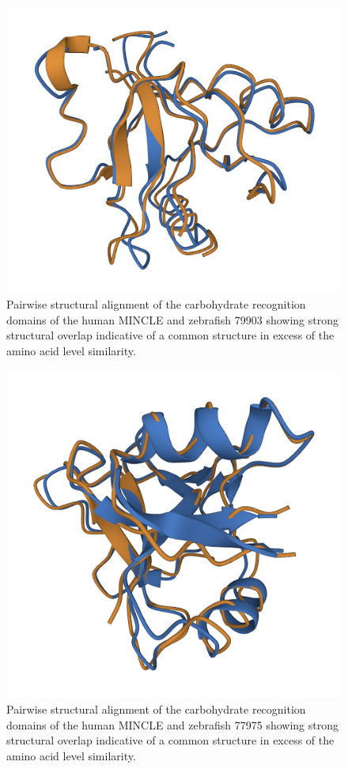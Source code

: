 \begin{figure}
\centering
\includegraphics[width=\textwidth]{images/79903_align.png}
\caption[Structural alignment of MINCLE and 79903]{Pairwise structural alignment of the carbohydrate recognition domains of the human MINCLE and zebrafish 79903 showing strong structural overlap indicative of a common structure in excess of the amino acid level similarity.}
\label{figure:79903}
\end{figure}

\begin{figure}
\centering
\includegraphics[width=\textwidth]{images/77975_align.png}
\caption[Structural alignment of MINCLE and 77975]{Pairwise structural alignment of the carbohydrate recognition domains of the human MINCLE and zebrafish 77975 showing strong structural overlap indicative of a common structure in excess of the amino acid level similarity.}
\label{figure:77975}
\end{figure}

